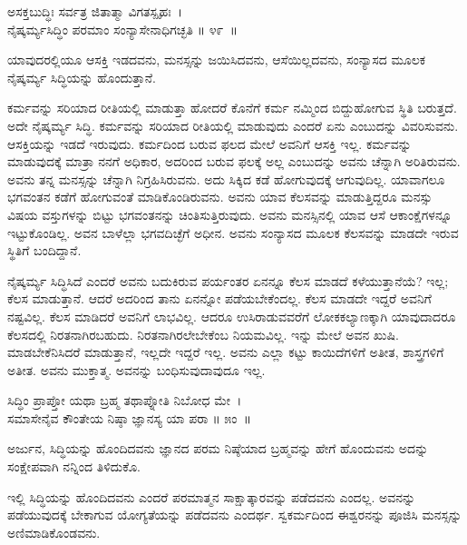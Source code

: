 \begin{shloka}
ಅಸಕ್ತಬುದ್ಧಿಃ ಸರ್ವತ್ರ ಜಿತಾತ್ಮಾ ವಿಗತಸ್ಪೃಹಃ~।\\ನೈಷ್ಕರ್ಮ್ಯಸಿದ್ಧಿಂ ಪರಮಾಂ ಸಂನ್ಯಾಸೇನಾಧಿಗಚ್ಛತಿ \hfill॥ ೪೯~॥
\end{shloka}

\begin{artha}
ಯಾವುದರಲ್ಲಿಯೂ ಆಸಕ್ತಿ ಇಡದವನು, ಮನಸ್ಸನ್ನು ಜಯಿಸಿದವನು, ಆಸೆಯಿಲ್ಲದವನು, ಸಂನ್ಯಾಸದ ಮೂಲಕ ನೈಷ್ಕರ್ಮ್ಯ ಸಿದ್ಧಿಯನ್ನು ಹೊಂದುತ್ತಾನೆ.
\end{artha}

ಕರ್ಮವನ್ನು ಸರಿಯಾದ ರೀತಿಯಲ್ಲಿ ಮಾಡುತ್ತಾ ಹೋದರೆ ಕೊನೆಗೆ ಕರ್ಮ ನಮ್ಮಿಂದ ಬಿದ್ದುಹೋಗುವ ಸ್ಥಿತಿ ಬರುತ್ತದೆ. ಅದೇ ನೈಷ್ಕರ್ಮ್ಯ ಸಿದ್ಧಿ. ಕರ್ಮವನ್ನು ಸರಿಯಾದ ರೀತಿಯಲ್ಲಿ ಮಾಡುವುದು ಎಂದರೆ ಏನು ಎಂಬುದನ್ನು ವಿವರಿಸುವನು. ಆಸಕ್ತಿಯನ್ನು ಇಡದೆ ಇರುವುದು. ಕರ್ಮದಿಂದ ಬರುವ ಫಲದ ಮೇಲೆ ಅವನಿಗೆ ಆಸಕ್ತಿ ಇಲ್ಲ. ಕರ್ಮವನ್ನು ಮಾಡುವುದಕ್ಕೆ ಮಾತ್ರಾ ನನಗೆ ಅಧಿಕಾರ, ಅದರಿಂದ ಬರುವ ಫಲಕ್ಕೆ ಅಲ್ಲ ಎಂಬುದನ್ನು ಅವನು ಚೆನ್ನಾಗಿ ಅರಿತಿರುವನು. ಅವನು ತನ್ನ ಮನಸ್ಸನ್ನು ಚೆನ್ನಾಗಿ ನಿಗ್ರಹಿಸಿರುವನು. ಅದು ಸಿಕ್ಕಿದ ಕಡೆ ಹೋಗುವುದಕ್ಕೆ ಆಗುವುದಿಲ್ಲ. ಯಾವಾಗಲೂ ಭಗವಂತನ ಕಡೆಗೆ ಹೋಗುವಂತೆ ಮಾಡಿಕೊಂಡಿರುವನು. ಅವನು ಯಾವ ಕೆಲಸವನ್ನು ಮಾಡುತ್ತಿದ್ದರೂ ಮನಸ್ಸು ವಿಷಯ ವಸ್ತುಗಳನ್ನು ಬಿಟ್ಟು ಭಗವಂತನನ್ನು ಚಿಂತಿಸುತ್ತಿರುವುದು. ಅವನು ಮನಸ್ಸಿನಲ್ಲಿ ಯಾವ ಆಸೆ ಆಕಾಂಕ್ಷೆಗಳನ್ನೂ ಇಟ್ಟುಕೊಂಡಿಲ್ಲ. ಅವನ ಬಾಳೆಲ್ಲಾ ಭಗವದಿಚ್ಛೆಗೆ ಅಧೀನ. ಅವನು ಸಂನ್ಯಾಸದ ಮೂಲಕ ಕೆಲಸವನ್ನು ಮಾಡದೇ ಇರುವ ಸ್ಥಿತಿಗೆ ಬಂದಿದ್ದಾನೆ.

ನೈಷ್ಕರ್ಮ್ಯ ಸಿದ್ಧಿಸಿದೆ ಎಂದರೆ ಅವನು ಬದುಕಿರುವ ಪರ್ಯಂತರ ಏನನ್ನೂ ಕೆಲಸ ಮಾಡದೆ ಕಳೆಯುತ್ತಾನೆಯೆ? ಇಲ್ಲ; ಕೆಲಸ ಮಾಡುತ್ತಾನೆ. ಆದರೆ ಅದರಿಂದ ತಾನು ಏನನ್ನೋ ಪಡೆಯ\-ಬೇಕೆಂದಲ್ಲ. ಕೆಲಸ ಮಾಡದೇ ಇದ್ದರೆ ಅವನಿಗೆ ನಷ್ಟವಿಲ್ಲ. ಕೆಲಸ ಮಾಡಿದರೆ ಅವನಿಗೆ ಲಾಭವಿಲ್ಲ. ಆದರೂ ಉಸಿರಾಡುವವರೆಗೆ ಲೋಕಕಲ್ಯಾಣಕ್ಕಾಗಿ ಯಾವುದಾದರೂ ಕೆಲಸದಲ್ಲಿ ನಿರತನಾಗಿರಬಹುದು. ನಿರತನಾಗಿರಲೇಬೇಕೆಂಬ ನಿಯಮವಿಲ್ಲ. ಇನ್ನು ಮೇಲೆ ಅವನ ಖುಷಿ. ಮಾಡಬೇಕೆನಿ\-ಸಿದರೆ ಮಾಡುತ್ತಾನೆ, ಇಲ್ಲದೇ ಇದ್ದರೆ ಇಲ್ಲ. ಅವನು ಎಲ್ಲಾ ಕಟ್ಟು ಕಾಯಿದೆಗಳಿಗೆ ಅತೀತ, ಶಾಸ್ತ್ರಗಳಿಗೆ ಅತೀತ. ಅವನು ಮುಕ್ತಾತ್ಮ. ಅವನನ್ನು ಬಂಧಿಸುವುದಾವುದೂ ಇಲ್ಲ.

\begin{shloka}
ಸಿದ್ಧಿಂ ಪ್ರಾಪ್ತೋ ಯಥಾ ಬ್ರಹ್ಮ ತಥಾಪ್ನೋತಿ ನಿಬೋಧ ಮೇ~।\\ಸಮಾಸೇನೈವ ಕೌಂತೇಯ ನಿಷ್ಠಾ ಜ್ಞಾನಸ್ಯ ಯಾ ಪರಾ \hfill॥ ೫ಂ~॥
\end{shloka}

\begin{artha}
ಅರ್ಜುನ, ಸಿದ್ಧಿಯನ್ನು ಹೊಂದಿದವನು ಜ್ಞಾನದ ಪರಮ ನಿಷ್ಠೆಯಾದ ಬ್ರಹ್ಮವನ್ನು ಹೇಗೆ ಹೊಂದುವನು ಅದನ್ನು ಸಂಕ್ಷೇಪವಾಗಿ ನನ್ನಿಂದ ತಿಳಿದುಕೊ.
\end{artha}

ಇಲ್ಲಿ ಸಿದ್ಧಿಯನ್ನು ಹೊಂದಿದವನು ಎಂದರೆ ಪರಮಾತ್ಮನ ಸಾಕ್ಷಾತ್ಕಾರವನ್ನು ಪಡೆದವನು ಎಂದಲ್ಲ. ಅವನನ್ನು ಪಡೆಯುವುದಕ್ಕೆ ಬೇಕಾಗುವ ಯೋಗ್ಯತೆಯನ್ನು ಪಡೆದವನು ಎಂದರ್ಥ. ಸ್ವಕರ್ಮದಿಂದ ಈಶ್ವರನನ್ನು ಪೂಜಿಸಿ ಮನಸ್ಸನ್ನು ಅಣಿಮಾಡಿಕೊಂಡವನು.


